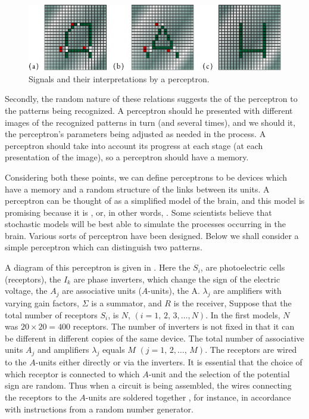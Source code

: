 \begin{figure}[!ht]
 \centering
 \includegraphics[width=\linewidth]{figures/perceptron1.pdf}
\caption{Signals and their interpretations by a perceptron.\label{perceptron1}}
 \end{figure}
Secondly, the random nature of these relations suggests the 
of the perceptron to the patterns being recognized. A perceptron should
he presented with different images of the recognized patterns in turn
(and several times), and we should  it, the perceptron's parameters
being adjusted as needed in the process. A perceptron should take into
account its progress at each stage (at each presentation of the image), so
a perceptron should have a memory.

Considering both these points, we can define perceptrons to be
devices which have a memory and a random structure of the links
between its units. A perceptron can be thought of as a simplified model
of the brain, and this model is promising because it is , or,
in other words, . Some scientists believe that stochastic models will be best able to simulate the processes occurring in the brain.
Various sorts of perceptron have been designed. Below we shall
consider a simple perceptron which can distinguish two patterns.

 A diagram of this
perceptron is given in . Here the $S_{i}$, are photoelectric cells (receptors), the $I_{k}$ are phase inverters, which change the sign of the electric voltage, the $A_{j}$ are associative units ($A$-units), the A. $\lambda_{j}$ are amplifiers with varying gain factors, $\Sigma$ is a summator, and $R$ is the receiver, Suppose that the total number of receptors $S_{i}$, is $N$, $(i = 1, \, 2, \, 3, \ldots{} , N)$. In the first models, $N$ was $20 \times 20 = 400$ receptors. The number of inverters is not fixed in that it can be different in different copies of the same device. The total number of associative units $A_{j}$ and amplifiers $\lambda_{j}$ equals $M \,\, (j = 1, \, 2, \ldots{} ,\, M)$. The receptors are wired to the $A$-units either directly or via the inverters. It is essential that the choice of which receptor is connected to which $A$-unit and the selection of the potential sign are random. Thus when a circuit is being assembled, the wires connecting the receptors to the $A$-units are soldered together , for instance, in accordance with instructions from a random
number generator.

